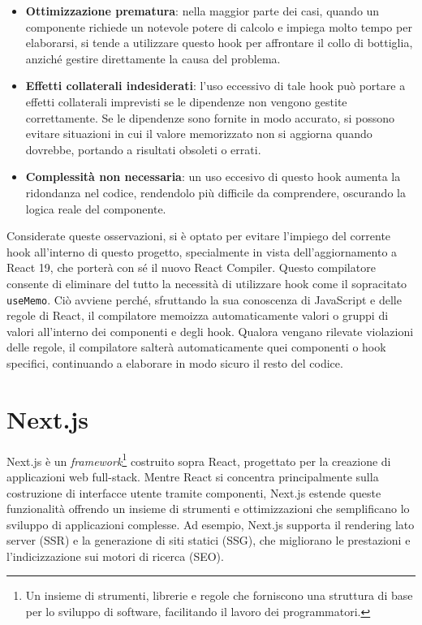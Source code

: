\documentclass[target=bach,aauheader=,style=]{thud}
\begin{document}
\begin{itemize}
    \item \textbf{Ottimizzazione prematura}: nella maggior parte dei casi, quando un componente richiede un notevole potere di calcolo e impiega molto tempo per elaborarsi, si tende a utilizzare questo hook per affrontare il collo di bottiglia, anziché gestire direttamente la causa del problema.
    \item \textbf{Effetti collaterali indesiderati}: l'uso eccessivo di tale hook può portare a effetti collaterali imprevisti se le dipendenze non vengono gestite correttamente. Se le dipendenze sono fornite in modo accurato, si possono evitare situazioni in cui il valore memorizzato non si aggiorna quando dovrebbe, portando a risultati obsoleti o errati.
    \item \textbf{Complessità non necessaria}: un uso eccesivo di questo hook aumenta la ridondanza nel codice, rendendolo più difficile da comprendere, oscurando la logica reale del componente.
\end{itemize}

\noindent Considerate queste osservazioni, si è optato per evitare l'impiego del corrente hook all'interno di questo progetto, specialmente in vista dell'aggiornamento a React 19, che porterà con sé il nuovo React Compiler. Questo compilatore consente di eliminare del tutto la necessità di utilizzare hook come il sopracitato \texttt{useMemo}. Ciò avviene perché, sfruttando la sua conoscenza di JavaScript e delle regole di React, il compilatore memoizza automaticamente valori o gruppi di valori all'interno dei componenti e degli hook. Qualora vengano rilevate violazioni delle regole, il compilatore salterà automaticamente quei componenti o hook specifici, continuando a elaborare in modo sicuro il resto del codice.

\section{Next.js}
Next.js \cite{nextjsdocs2024} è un \textit{framework}\footnote{Un insieme di strumenti, librerie e regole che forniscono una struttura di base per lo sviluppo di software, facilitando il lavoro dei programmatori.} costruito sopra React, progettato per la creazione di applicazioni web full-stack. Mentre React si concentra principalmente sulla costruzione di interfacce utente tramite componenti, Next.js estende queste funzionalità offrendo un insieme di strumenti e ottimizzazioni che semplificano lo sviluppo di applicazioni complesse\cite{dinku2022react}. Ad esempio, Next.js supporta il rendering lato server (SSR) e la generazione di siti statici (SSG), che migliorano le prestazioni e l'indicizzazione sui motori di ricerca (SEO).
\end{document}
